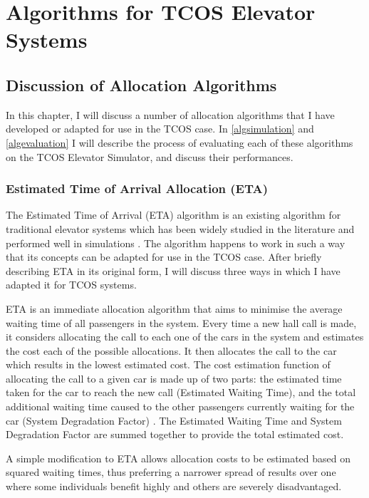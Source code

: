 \documentclass{UoYCSproject}
\begin{document}
\part{Algorithms for TCOS Elevator Systems}

\chapter{Discussion of Allocation Algorithms}
\label{algdiscussion}

In this chapter, I will discuss a number of allocation algorithms that I have developed or adapted for use in the TCOS case.  In \autoref{algsimulation} and \autoref{algevaluation} I will describe the process of evaluating each of these algorithms on the TCOS Elevator Simulator, and discuss their performances.

\section{Estimated Time of Arrival Allocation (ETA)}
\label{algETAdescription}

The Estimated Time of Arrival (ETA) algorithm is an existing algorithm for traditional elevator systems which has been widely studied in the literature \citep{Rong2003, Nikovski2003} and performed well in simulations \citep{Rong2003}.  The algorithm happens to work in such a way that its concepts can be adapted for use in the TCOS case.  After briefly describing ETA in its original form, I will discuss three ways in which I have adapted it for TCOS systems.

ETA is an immediate allocation algorithm that aims to minimise the average waiting time of all passengers in the system.  Every time a new hall call is made, it considers allocating the call to each one of the cars in the system and estimates the cost each of the possible allocations.  It then allocates the call to the car which results in the lowest estimated cost.  The cost estimation function of allocating the call to a given car is made up of two parts: the estimated time taken for the car to reach the new call (Estimated Waiting Time), and the total additional waiting time caused to the other passengers currently waiting for the car (System Degradation Factor) \citep{Rong2003}.  The Estimated Waiting Time and System Degradation Factor are summed together to provide the total estimated cost.

A simple modification to ETA allows allocation costs to be estimated based on squared waiting times, thus preferring a narrower spread of results over one where some individuals benefit highly and others are severely disadvantaged.
\end{document}
